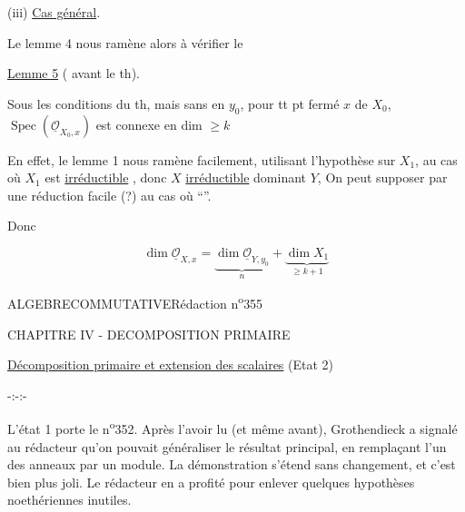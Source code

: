(iii) \uline{Cas général}.


Le lemme 4 nous ramène alors à vérifier le

\uline{Lemme 5} ( avant le th).

Sous les conditions du th, mais sans   en $y_0$,  pour tt pt fermé $x$ de $X_0$,  $\operatorname{Spec}(\underline{\mathcal O}_{X_0,x})$ est connexe en dim $\geq k$

En effet, le lemme 1  nous ramène facilement, utilisant l'hypothèse sur $X_1$, au cas où $X_1$ est \uline{irréductible} , donc $X$ \uline{irréductible} dominant $Y$,  On peut supposer par une réduction facile (?) au cas où ``''.

Donc

\[
\dim\underline{\mathcal O}_{X,x}=\underbrace{\dim\underline{\mathcal O}_{Y,y_0}}_{n}+\underbrace{\dim X_1}_{\geq k+1}
\]

\noindent\hfill ALGEBRE\quad COMMUTATIVE\hfill Rédaction n\textsuperscript{o}355

CHAPITRE IV - DECOMPOSITION PRIMAIRE

\uline{Décomposition primaire et extension des scalaires} (Etat 2)

\begin{center}-:-:-\end{center}

L'état 1 porte le n\textsuperscript{o}352. Après l'avoir lu (et même avant), Grothendieck a signalé au rédacteur qu'on pouvait généraliser le résultat principal, en remplaçant l'un des anneaux par un module. La démonstration s'étend sans changement, et c'est bien plus joli. Le rédacteur en a profité pour enlever quelques hypothèses noethériennes inutiles.

